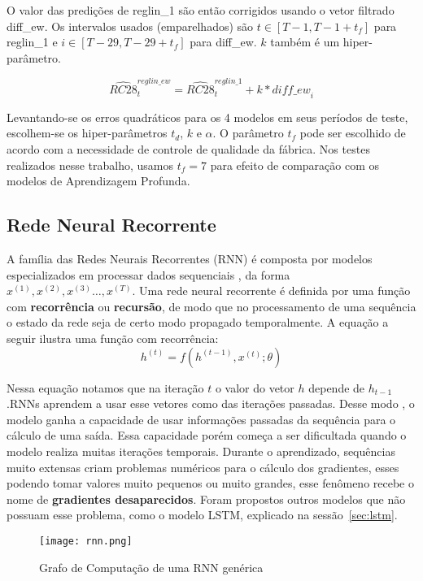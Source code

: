 O valor das predições de reglin\_1 são então corrigidos usando o vetor filtrado
diff\_ew. Os intervalos usados (emparelhados) são $t \in [T-1,T-1+t_f]$ para
reglin\_1 e $i \in [T-29,T-29+t_f]$ para diff\_ew. $k$ também é um hiper-parâmetro.

\[
     \hat{RC28}_t^{reglin\_ew} = \hat{RC28}^{reglin\_1}_t + k * \mathit{diff\_ew}_i
\]


Levantando-se os erros quadráticos para os 4 modelos em seus períodos de
teste, escolhem-se os hiper-parâmetros $t_d$, $k$ e $\alpha$. O parâmetro $t_f$ pode ser
escolhido de acordo com a necessidade de controle de qualidade da fábrica. Nos
testes realizados nesse trabalho, usamos $t_f=7$ para efeito de comparação com
os modelos de Aprendizagem Profunda. 

\subsection{Rede Neural Recorrente}
% 

A família das Redes Neurais Recorrentes (RNN) é composta por modelos especializados
em processar dados sequenciais \citep{dlbook}, da forma $x^{(1)},x^{(2)} ,x^{(3)}\dots ,x^{(T)}$. Uma rede neural recorrente é definida por uma função com
\textbf{recorrência} ou \textbf{recursão}, de modo que no processamento de uma
sequência o estado da rede seja de certo modo propagado temporalmente.
A equação a seguir ilustra uma função com recorrência: \\

\[h^{(t)} = f(h^{(t-1)},x^{(t)};\theta)\]

Nessa equação notamos que na iteração $t$ o valor do vetor $h$ depende de
$h_{t-1}$.RNNs aprendem a usar esse vetores como
 das iterações passadas. Desse modo , o modelo ganha a capacidade
de usar informações passadas da sequência para o cálculo
de uma saída. Essa capacidade porém começa a ser dificultada quando o modelo
realiza muitas iterações temporais. Durante o aprendizado, sequências muito
extensas criam problemas numéricos para o cálculo dos gradientes, esses podendo
tomar valores muito pequenos ou muito grandes, esse fenômeno recebe o nome de
\textbf{gradientes desaparecidos}. Foram propostos outros modelos
que não possuam esse problema, como o modelo LSTM, explicado na sessão~\ref{sec:lstm}. 

\begin{figure}[H]
\centering
\texttt{[image: rnn.png]}
\caption{Grafo de Computação de uma RNN genérica \citep{dlbook}}
\label{fig:rnngraph}
\end{figure}

